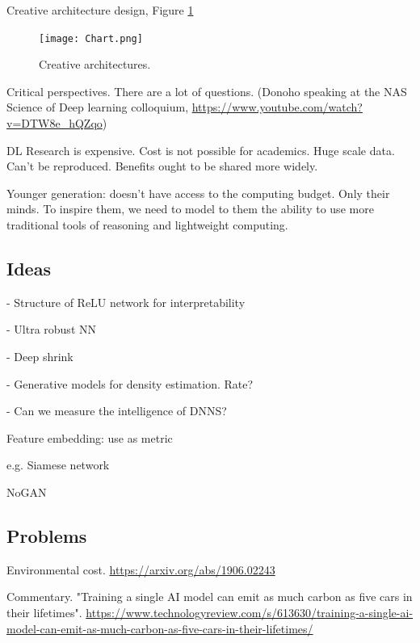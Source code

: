 \documentclass[english]{article}
\begin{document}
\item Creative architecture design, Figure \ref{arch}

 
\begin{figure}
  \centering
  \texttt{[image: Chart.png]}
  \caption{Creative architectures.}
  \label{arch}
\end{figure}

\item Critical perspectives. There are a lot of questions. (Donoho speaking at the NAS Science of Deep learning colloquium, \url{https://www.youtube.com/watch?v=DTW8e_hQZqo})

DL Research is expensive. Cost is not possible for academics. Huge scale data. Can't be reproduced. Benefits ought to be shared more widely. 

Younger generation: doesn't have access to the computing budget. Only their minds. To inspire them, we need to model to them the ability to use more traditional tools of reasoning and lightweight computing.


\eenum

\subsection{Ideas}
\benum
\item

- Structure of ReLU network for interpretability

- Ultra robust NN

- Deep shrink 

- Generative models for density estimation. Rate? 

- Can we measure the intelligence of DNNS? 

\item Feature embedding: use as metric

e.g. Siamese network

NoGAN
\eenum


\subsection{Problems}
\benum
\item Environmental cost. \url{https://arxiv.org/abs/1906.02243}

Commentary. "Training a single AI model can emit as much carbon as five cars in their lifetimes". \url{https://www.technologyreview.com/s/613630/training-a-single-ai-model-can-emit-as-much-carbon-as-five-cars-in-their-lifetimes/}
\end{document}
